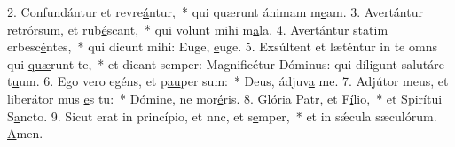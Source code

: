 2. Confundántur et revre\uline{á}ntur,~* qui quærunt ánimam m\uline{e}am.
3. Avertántur retrórsum, et rub\uline{é}scant,~* qui volunt mihi m\uline{a}la.
4. Avertántur statim erbesc\uline{é}ntes,~* qui dicunt mihi: Euge, \uline{e}uge.
5. Exsúltent et læténtur in te omns qui \uline{quæ}runt te,~* et dicant semper: Magnificétur Dóminus: qui díligunt salutáre t\uline{u}um.
6. Ego vero egéns, et p\uline{au}per sum:~* Deus, ádjuv\uline{a} me.
7. Adjútor meus, et liberátor mus \uline{e}s tu:~* Dómine, ne mor\uline{é}ris.
8. Glória Patr, et F\uline{í}lio,~* et Spirítui S\uline{a}ncto.
9. Sicut erat in princípio, et nnc, et s\uline{e}mper,~* et in sǽcula sæculórum. \uline{A}men.
